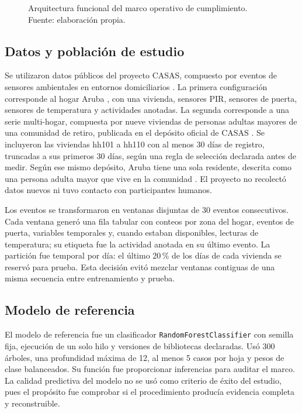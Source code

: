 \begin{figure}[htbp]
  \centering
  
  \caption{Arquitectura funcional del marco operativo de cumplimiento. Fuente: elaboración propia.}
  \label{fig:arquitectura}
\end{figure}

\subsection{Datos y población de estudio}

Se utilizaron datos públicos del proyecto CASAS, compuesto por eventos de
sensores ambientales en entornos domiciliarios \cite{cook2013casas}. La primera
configuración corresponde al hogar Aruba \cite{cook2012aruba}, con una vivienda,
sensores PIR, sensores de puerta, sensores de temperatura y actividades
anotadas. La segunda corresponde a una serie multi-hogar, compuesta por nueve
viviendas de personas adultas mayores de una comunidad de retiro, publicada en
el depósito oficial de CASAS \cite{cook2025zenodo}. Se incluyeron las viviendas
hh101 a hh110 con al menos 30 días de registro, truncadas a sus primeros 30 días,
según una regla de selección declarada antes de medir.
Según ese mismo depósito, Aruba tiene una sola residente, descrita como una
persona adulta mayor que vive en la comunidad \cite{cook2025zenodo}. El
proyecto no recolectó datos nuevos ni tuvo contacto con participantes humanos.

Los eventos se transformaron en ventanas disjuntas de 30 eventos consecutivos.
Cada ventana generó una fila tabular con conteos por zona del hogar, eventos de
puerta, variables temporales y, cuando estaban disponibles, lecturas de
temperatura; su etiqueta fue la actividad anotada en su último evento. La
partición fue temporal por día: el último 20\,\% de los días de cada vivienda se
reservó para prueba. Esta decisión evitó mezclar ventanas contiguas
de una misma secuencia entre entrenamiento y prueba.

\subsection{Modelo de referencia}

El modelo de referencia fue un clasificador \texttt{RandomForestClassifier}
\cite{breiman2001rf,pedregosa2011sklearn} con semilla fija, ejecución de un solo hilo y versiones de bibliotecas declaradas.
Usó 300 árboles, una profundidad máxima de 12, al menos 5 casos por hoja y pesos
de clase balanceados.
Su función fue proporcionar inferencias para auditar el marco. La calidad
predictiva del modelo no se usó como criterio de éxito del estudio, pues el
propósito fue comprobar si el procedimiento producía evidencia completa y
reconstruible.

